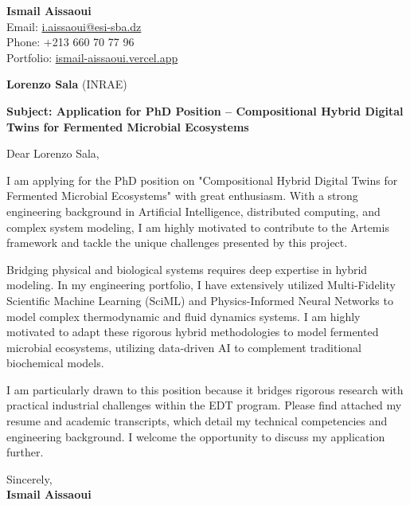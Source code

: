 \documentclass[11pt,a4paper]{article}
\begin{document}
\thispagestyle{empty}

\begin{flushright}
\textbf{Ismail Aissaoui} \\
Email: \href{mailto:i.aissaoui@esi-sba.dz}{i.aissaoui@esi-sba.dz} \\
Phone: +213 660 70 77 96 \\
Portfolio: \href{https://ismail-aissaoui.vercel.app}{ismail-aissaoui.vercel.app}
\end{flushright}

\vspace{1em}

\begin{flushleft}
\textbf{Lorenzo Sala} (INRAE)
\end{flushleft}

\vspace{1em}
\noindent\textbf{Subject: Application for PhD Position -- Compositional Hybrid Digital Twins for Fermented Microbial Ecosystems}
\vspace{1em}

\noindent Dear Lorenzo Sala,

\vspace{1em}
\noindent
I am applying for the PhD position on "Compositional Hybrid Digital Twins for Fermented Microbial Ecosystems" with great enthusiasm. With a strong engineering background in Artificial Intelligence, distributed computing, and complex system modeling, I am highly motivated to contribute to the Artemis framework and tackle the unique challenges presented by this project.

\vspace{0.5em}
\noindent
Bridging physical and biological systems requires deep expertise in hybrid modeling. In my engineering portfolio, I have extensively utilized Multi-Fidelity Scientific Machine Learning (SciML) and Physics-Informed Neural Networks to model complex thermodynamic and fluid dynamics systems. I am highly motivated to adapt these rigorous hybrid methodologies to model fermented microbial ecosystems, utilizing data-driven AI to complement traditional biochemical models.

\vspace{0.5em}
\noindent
I am particularly drawn to this position because it bridges rigorous research with practical industrial challenges within the EDT program. Please find attached my resume and academic transcripts, which detail my technical competencies and engineering background. I welcome the opportunity to discuss my application further.

\vspace{1.5em}
\noindent
Sincerely, \\[0.5em]
\textbf{Ismail Aissaoui}
\end{document}
